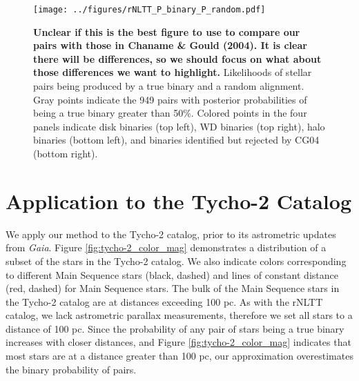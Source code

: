\documentclass[usenatbib]{mnras}
\begin{document}
\begin{figure*}
\begin{center}
\texttt{[image: ../figures/rNLTT\_P\_binary\_P\_random.pdf]}
\caption{ {\bf Unclear if this is the best figure to use to compare our pairs with those in Chaname \& Gould (2004). It is clear there will be differences, so we should focus on what about those differences we want to highlight.} Likelihoods of stellar pairs being produced by a true binary and a random alignment. Gray points indicate the 949 pairs with posterior probabilities of being a true binary greater than 50\%. Colored points in the four panels indicate disk binaries (top left), WD binaries (top right), halo binaries (bottom left), and binaries identified but rejected by CG04 (bottom right). }
\label{fig:NLTT_probabilities}
\end{center}
\end{figure*}








\section{Application to the Tycho-2 Catalog}

We apply our method to the Tycho-2 catalog, prior to its astrometric updates from {\it Gaia}. Figure \ref{fig:tycho-2_color_mag} demonstrates a distribution of a subset of the stars in the Tycho-2 catalog. We also indicate colors corresponding to different Main Sequence stars (black, dashed) and lines of constant distance (red, dashed) for Main Sequence stars. The bulk of the Main Sequence stars in the Tycho-2 catalog are at distances exceeding 100 pc. As with the rNLTT catalog, we lack astrometric parallax measurements, therefore we set all stars to a distance of 100 pc. Since the probability of any pair of stars being a true binary increases with closer distances, and Figure \ref{fig:tycho-2_color_mag} indicates that most stars are at a distance greater than 100 pc, our approximation overestimates the binary probability of pairs.
\end{document}
